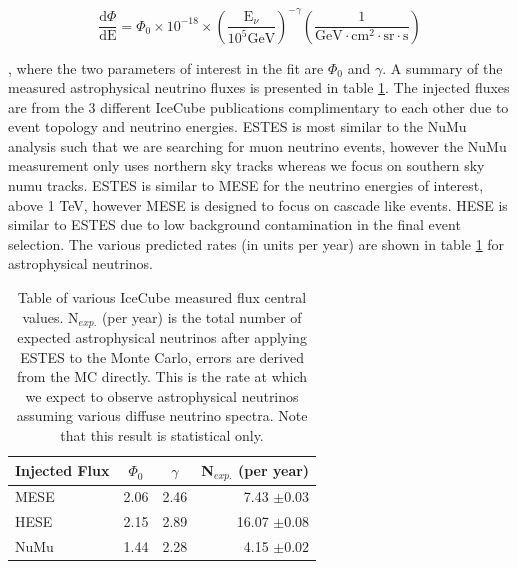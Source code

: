 \documentclass{PoS}
\begin{document}
\begin{equation}
\frac{\mathrm{d}\Phi}{\mathrm{dE}} = \Phi_{0} \times 10^{-18} \times (\frac{\mathrm{E}_{\nu}}{10^{5} \mathrm{GeV}})^{-\gamma} (\frac{1}{\mathrm{GeV\cdot cm^{2}\cdot sr\cdot s}})
\end{equation}

, where the two parameters of interest in the fit are $\Phi_{0}$ and $\gamma$. 
A summary of the measured astrophysical neutrino fluxes is presented in table \ref{tab:fluxes}. The injected fluxes are from the 3 different IceCube publications complimentary to each other due to event topology and neutrino energies. ESTES is most similar to the NuMu analysis\cite{icrc:numu} such that we are searching for muon neutrino events, however the NuMu measurement only uses northern sky tracks whereas we focus on southern sky numu tracks. ESTES is similar to MESE \cite{MESE:2year} for the neutrino energies of interest, above 1 TeV, however MESE is designed to focus on cascade like events. HESE\cite{Austin:HESE} is similar to ESTES due to low background contamination in the final event selection. The various predicted rates (in units per year) are shown in table \ref{tab:fluxes} for astrophysical neutrinos. 

\begin{table}[h!]
\centering 
\begin{tabular}{l|c|c|r}
\hline
Injected Flux & $\Phi_{0}$ & $\gamma$ & N$_{exp.}$ (per year) \\ \hline \hline 
MESE\cite{MESE:2year} & 2.06 & 2.46 & 7.43 $\pm0.03$ \\ \hline
HESE\cite{Austin:HESE} & 2.15 & 2.89 & 16.07 $\pm0.08$ \\ \hline
NuMu\cite{icrc:numu} & 1.44 & 2.28 & 4.15 $\pm0.02$ \\ \hline
\end{tabular}
\caption{Table of various IceCube measured flux central values. N$_{exp.}$ (per year) is the total number of expected astrophysical neutrinos after applying ESTES to the Monte Carlo, errors are derived from the MC directly. This is the rate at which we expect to observe astrophysical neutrinos assuming various diffuse neutrino spectra. Note that this result is statistical only.}
\label{tab:fluxes}
\end{table}

\end{document}
